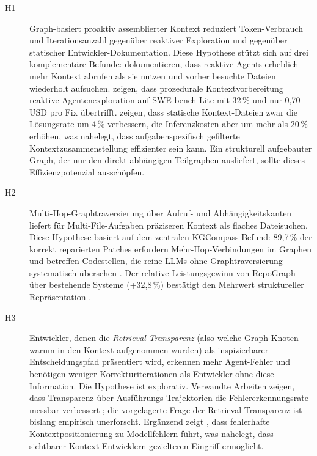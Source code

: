 \begin{description}
  \item[H1] Graph-basiert proaktiv assemblierter Kontext reduziert Token-Verbrauch und Iterationsanzahl gegenüber reaktiver Exploration und gegenüber statischer Entwickler-Dokumentation. Diese Hypothese stützt sich auf drei komplementäre Befunde: \textcite{li2026contextbench} dokumentieren, dass reaktive Agents erheblich mehr Kontext abrufen als sie nutzen und vorher besuchte Dateien wiederholt aufsuchen. \textcite{xia2024agentless} zeigen, dass prozedurale Kontextvorbereitung reaktive Agentenexploration auf SWE-bench Lite mit 32\,\% und nur 0,70\,USD pro Fix übertrifft. \textcite{gloaguen2026agentsmd} zeigen, dass statische Kontext-Dateien zwar die Lösungsrate um 4\,\% verbessern, die Inferenzkosten aber um mehr als 20\,\% erhöhen, was nahelegt, dass aufgabenspezifisch gefilterte Kontextzusammenstellung effizienter sein kann. Ein strukturell aufgebauter Graph, der nur den direkt abhängigen Teilgraphen ausliefert, sollte dieses Effizienzpotenzial ausschöpfen.

  \item[H2] Multi-Hop-Graphtraversierung über Aufruf- und Abhängigkeitskanten liefert für Multi-File-Aufgaben präziseren Kontext als flaches Dateisuchen. Diese Hypothese basiert auf dem zentralen KGCompass-Befund: 89,7\,\% der korrekt reparierten Patches erfordern Mehr-Hop-Verbindungen im Graphen und betreffen Codestellen, die reine LLMs ohne Graphtraversierung systematisch übersehen \parencite{yang2025kgcompass}. Der relative Leistungsgewinn von RepoGraph über bestehende Systeme (+32,8\,\%) bestätigt den Mehrwert struktureller Repräsentation \parencite{ouyang2024repograph}.

  \item[H3] Entwickler, denen die \emph{Retrieval-Transparenz} (also welche Graph-Knoten warum in den Kontext aufgenommen wurden) als inspizierbarer Entscheidungspfad präsentiert wird, erkennen mehr Agent-Fehler und benötigen weniger Korrekturiterationen als Entwickler ohne diese Information. Die Hypothese ist explorativ. Verwandte Arbeiten zeigen, dass Transparenz über Ausführungs-Trajektorien die Fehlererkennungsrate messbar verbessert \parencite{agentstepper2026}; die vorgelagerte Frage der Retrieval-Transparenz ist bislang empirisch unerforscht. Ergänzend zeigt \textcite{liu2023lostmiddle}, dass fehlerhafte Kontextpositionierung zu Modellfehlern führt, was nahelegt, dass sichtbarer Kontext Entwicklern gezielteren Eingriff ermöglicht.
\end{description}
